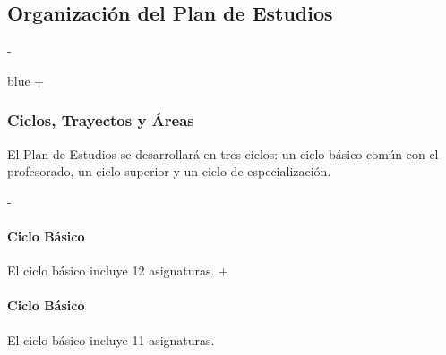 \begin{description}
 
 \subsection{Organización del Plan de Estudios}
-\begin{colortext}{blue}
+
 \subsubsection{Ciclos, Trayectos  y Áreas} El Plan de Estudios se desarrollará en tres ciclos:
 un ciclo básico común con el profesorado, un ciclo superior y un
 ciclo de especialización.
 
-\paragraph{Ciclo Básico} El ciclo básico incluye 12 asignaturas.
+\paragraph{Ciclo Básico} El ciclo básico incluye 11 asignaturas.
 

\end{colortext}
\end{description}
